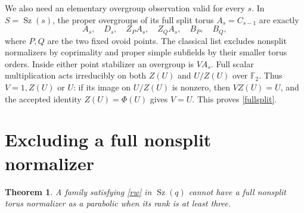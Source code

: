 \documentclass[11pt,a4paper]{article}
\newtheorem{theorem}[lemma]{Theorem}
\newcommand{\F}{\mathbb F}
\newcommand{\Sz}{\operatorname{Sz}}
\begin{document}
We also need an elementary overgroup observation valid for every $s$.
In $S=\Sz(s)$, the proper overgroups of its full split torus
$A_s=C_{s-1}$ are exactly
\begin{equation}\label{fullsplit}
 A_s,\quad D_s,\quad Z_P A_s,\quad Z_Q A_s,\quad B_P,\quad B_Q,
\end{equation}
where $P,Q$ are the two fixed ovoid points. The classical list excludes
nonsplit normalizers by coprimality and proper simple subfields by their
smaller torus orders. Inside either point stabilizer an overgroup is
$V A_s$. Full scalar multiplication acts irreducibly on both $Z(U)$
and $U/Z(U)$ over $\F_2$. Thus $V=1,Z(U)$ or $U$: if its image
on $U/Z(U)$ is nonzero, then $VZ(U)=U$, and the accepted identity
$Z(U)=\Phi(U)$ gives $V=U$. This proves \eqref{fullsplit}.

\section{Excluding a full nonsplit normalizer}
\begin{theorem}\label{nonsplit}
A family satisfying \eqref{rw} in $\Sz(q)$ cannot have a full
nonsplit torus normalizer as a parabolic when its rank is at least three.
\end{theorem}
\end{document}
